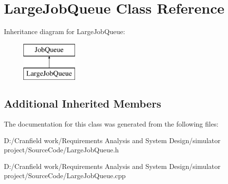 \hypertarget{class_large_job_queue}{}\section{Large\+Job\+Queue Class Reference}
\label{class_large_job_queue}
Inheritance diagram for Large\+Job\+Queue\+:\begin{figure}[H]
\begin{center}
\leavevmode
\includegraphics[height=2.000000cm]{class_large_job_queue}
\end{center}
\end{figure}
\subsection*{Additional Inherited Members}


The documentation for this class was generated from the following files\+:\begin{DoxyCompactItemize}
\item 
D\+:/\+Cranfield work/\+Requirements Analysis and System Design/simulator project/\+Source\+Code/Large\+Job\+Queue.\+h\item 
D\+:/\+Cranfield work/\+Requirements Analysis and System Design/simulator project/\+Source\+Code/Large\+Job\+Queue.\+cpp\end{DoxyCompactItemize}
